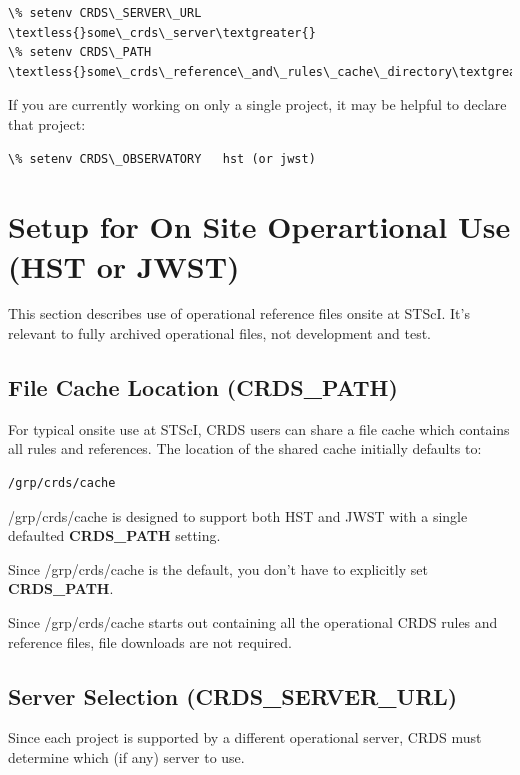 \documentclass[letterpaper,10pt,english]{sphinxmanual}
\begin{document}
\begin{Verbatim}[commandchars=\\\{\}]
\% setenv CRDS\_SERVER\_URL  \textless{}some\_crds\_server\textgreater{}
\% setenv CRDS\_PATH        \textless{}some\_crds\_reference\_and\_rules\_cache\_directory\textgreater{}
\end{Verbatim}

If you are currently working on only a single project,  it may be helpful to declare that project:

\begin{Verbatim}[commandchars=\\\{\}]
\% setenv CRDS\_OBSERVATORY   hst (or jwst)
\end{Verbatim}


\section{Setup for On Site Operartional Use (HST or JWST)}
\label{installation:setup-for-on-site-operartional-use-hst-or-jwst}
This section describes use of operational reference files onsite at STScI.  It's relevant to fully archived
operational files,  not development and test.


\subsection{File Cache Location (CRDS\_PATH)}
\label{installation:file-cache-location-crds-path}
For typical onsite use at STScI, CRDS users can share a file cache which contains all rules and references.  The
location of the shared cache initially defaults to:

\begin{Verbatim}[commandchars=\\\{\}]
/grp/crds/cache
\end{Verbatim}

/grp/crds/cache is designed to support both HST and JWST with a single defaulted \textbf{CRDS\_PATH} setting.

Since /grp/crds/cache is the default,  you don't have to explicitly set \textbf{CRDS\_PATH}.

Since /grp/crds/cache starts out containing all the operational CRDS rules and reference files, file downloads
are not required.


\subsection{Server Selection (CRDS\_SERVER\_URL)}
\label{installation:server-selection-crds-server-url}
Since each project is supported by a different operational server, CRDS must determine which (if any)
server to use.
\end{document}
